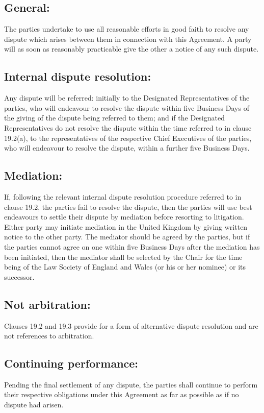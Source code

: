 \documentclass[a4paper,12pt]{article}
\begin{document}
\subsection{General:}  The parties undertake to use all reasonable efforts in good faith to resolve any dispute which arises between them in connection with this Agreement.  A party will as soon as reasonably practicable give the other a notice of any such dispute.
\subsection{Internal dispute resolution:} Any dispute will be referred:
initially to the Designated Representatives of the parties, who will endeavour to resolve the dispute within five Business Days of the giving of the dispute being referred to them; and
if the Designated Representatives do not resolve the dispute within the time referred to in clause 19.2(a), to the representatives of the respective Chief Executives of the parties, who will endeavour to resolve the dispute, within a further five Business Days.
\subsection{Mediation:}  If, following the relevant internal dispute resolution procedure referred to in clause 19.2, the parties fail to resolve the dispute, then the parties will use best endeavours to settle their dispute by mediation before resorting to litigation.  Either party may initiate mediation in the United Kingdom by giving written notice to the other party.  The mediator should be agreed by the parties, but if the parties cannot agree on one within five Business Days after the mediation has been initiated, then the mediator shall be selected by the Chair for the time being of the Law Society of England and Wales (or his or her nominee) or its successor.
\subsection{Not arbitration:}  Clauses 19.2 and 19.3 provide for a form of alternative dispute resolution and are not references to arbitration.
\subsection{Continuing performance:} Pending the final settlement of any dispute, the parties shall continue to perform their respective obligations under this Agreement as far as possible as if no dispute had arisen.
\end{document}
